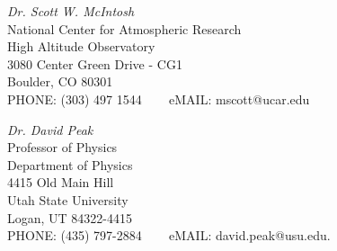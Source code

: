 \documentclass[letterpaper,10pt]{article}
\def\footerlink{}
\begin{document}
  \begin{tabbing}
 \emph{Dr. Scott W. McIntosh}\\
National Center for Atmospheric Research\\
High Altitude Observatory \\
 3080 Center Green Drive - CG1	 \\
Boulder, CO 80301	  \\ 
PHONE:  (303) 497 1544  \,\,\,\,\,\,\,\,\, eMAIL: mscott@ucar.edu
\end{tabbing}



  \begin{tabbing}
 \emph{Dr. David Peak}\\
 Professor of Physics \\
Department of Physics \\
4415 Old Main Hill \\
Utah State University \\
Logan, UT 84322-4415  \\ 
PHONE:  (435) 797-2884  \,\,\,\,\,\,\,\,\, eMAIL: david.peak@usu.edu.
\end{tabbing}






\end{document}

